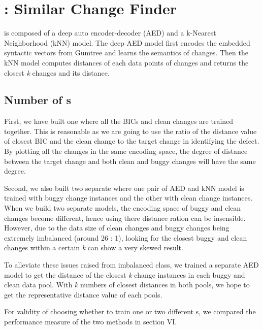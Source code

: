 \section{{\simfin}: Similar Change Finder}
{\simfin} is composed of a deep auto encoder-decoder (AED) and a k-Nearest Neighborhood (kNN) model.
The deep AED model first encodes the embedded syntactic vectors from Gumtree and learns the semantics of changes.
Then the kNN model computes distances of each data points of changes and returns the closest \emph{k} changes and its distance.

\subsection{Number of {\simfin}s}
First, we have built one {\simfin} where all the BICs and clean changes are trained together.
This is reasonable as we are going to use the ratio of the distance value of closest BIC and the clean change to the target change in identifying the defect.
By plotting all the changes in the same encoding space, the degree of distance between the target change and both clean and buggy changes will have the same degree.

Second, we also built two separate {\simfin} where one pair of AED and kNN model is trained with buggy change instances and the other with clean change instances.
When we build two separate {\simfin} models, the encoding space of buggy and clean changes become different, hence using there distance ration can be insensible.
However, due to the data size of clean changes and buggy changes being extremely imbalanced (around 26 : 1), looking for the closest buggy and clean changes within a certain \emph{k} can show a very skewed result.

To alleviate these issues raised from imbalanced class, we trained a separate AED model to get the distance of the closest \emph{k} change instances in each buggy and clean data pool.
With \emph{k} numbers of closest distances in both pools, we hope to get the representative distance value of each pools.

For validity of choosing whether to train one or two different {\simfin}s, we compared the performance measure of the two methods in section VI.


